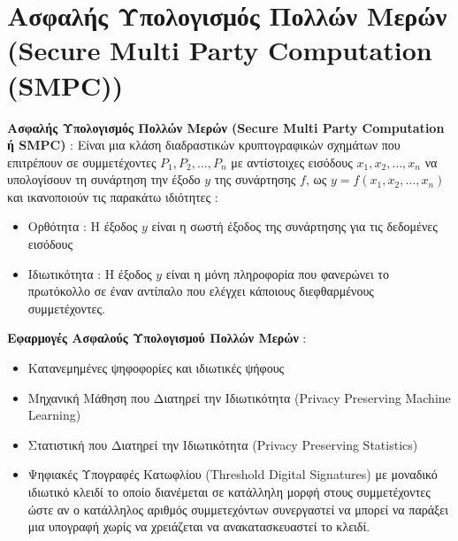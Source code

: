 \documentclass[10pt]{beamer}
\begin{document}
    \section{Ασφαλής Υπολογισμός Πολλών Μερών \\ (Secure Multi Party Computation (SMPC))}
    \begin{frame}
        \begin{block}{}
            \textbf{Ασφαλής Υπολογισμός Πολλών Μερών (Secure Multi Party Computation ή SMPC)} : Είναι μια κλάση διαδραστικών κρυπτογραφικών σχημάτων που επιτρέπουν σε συμμετέχοντες $P_1, P_2, \dots, P_n$ με αντίστοιχες εισόδους $x_1, x_2, \dots, x_n$ να υπολογίσουν τη συνάρτηση την έξοδο $y$ της συνάρτησης $f$, ως $y = f(x_1, x_2, \dots, x_n)$ και ικανοποιούν τις παρακάτω ιδιότητες :
            \begin{itemize}
                \item Ορθότητα : Η έξοδος $y$ είναι η σωστή έξοδος της συνάρτησης για τις δεδομένες εισόδους
                \item Ιδιωτικότητα : Η έξοδος $y$ είναι η μόνη πληροφορία που φανερώνει το πρωτόκολλο σε έναν αντίπαλο που ελέγχει κάποιους διεφθαρμένους συμμετέχοντες.
            \end{itemize}
        \end{block}
    \end{frame}

    \begin{frame}
        \begin{block}{}
            \textbf{Εφαρμογές Ασφαλούς Υπολογισμού Πολλών Μερών} :
            \begin{itemize}
                \item Κατανεμημένες ψηφοφορίες και ιδιωτικές ψήφους
                \item Μηχανική Μάθηση που Διατηρεί την Ιδιωτικότητα (Privacy Preserving Machine Learning)
                \item Στατιστική που Διατηρεί την Ιδιωτικότητα (Privacy Preserving Statistics)
                \item Ψηφιακές Υπογραφές Κατωφλίου (Threshold Digital Signatures) με μοναδικό ιδιωτικό κλειδί το οποίο διανέμεται σε κατάλληλη μορφή στους συμμετέχοντες ώστε αν ο κατάλληλος αριθμός συμμετεχόντων συνεργαστεί να μπορεί να παράξει μια υπογραφή χωρίς να χρειάζεται να ανακατασκευαστεί το κλειδί.
            \end{itemize}
        \end{block}
    \end{frame}
\end{document}
